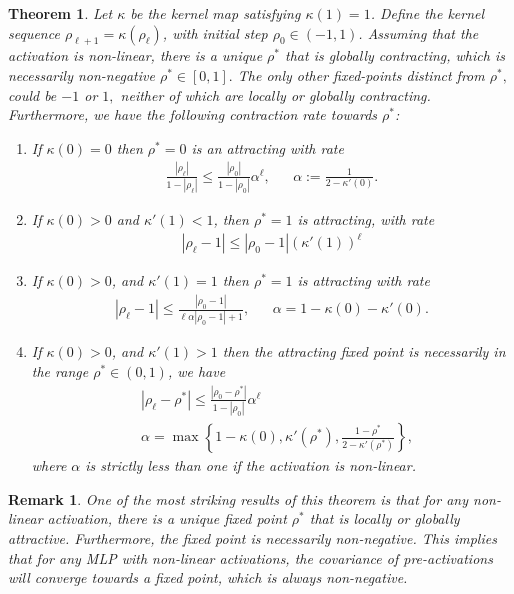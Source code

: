 \documentclass[twoside]{article}
\newtheorem{theorem}{Theorem}
\newtheorem{remark}{Remark}
\theoremstyle{definition}
\begin{document}
\begin{theorem}
Let $\kappa$ be the kernel map satisfying $\kappa(1)=1$. Define the kernel sequence $\rho_{\ell+1}=\kappa(\rho_\ell)$, with initial step $\rho_0 \in (-1,1)$. Assuming that the activation is non-linear, there is a unique $\rho^*$ that is globally contracting, which is necessarily non-negative $\rho^*\in[0,1].$ The only other fixed-points distinct from $\rho^*,$ could be $-1$ or $1,$ neither of which are locally or globally contracting. Furthermore, we have the following contraction rate towards $\rho^*$:
\begin{enumerate}
    \item If $\kappa(0)=0$ then $\rho^*=0$ is an attracting with rate 
    \begin{align*}
    \frac{|\rho_\ell|}{1-|\rho_\ell|} \le \frac{|\rho_0|}{1-|\rho_0|} \alpha^\ell, && \alpha:=\frac{1}{2-\kappa'(0)}.
    \end{align*}
    \item If $\kappa(0)>0$ and $\kappa'(1)<1$, then $\rho^*=1$ is attracting, with rate 
    \begin{align*}
    |\rho_\ell-1| \le |\rho_0-1| (\kappa'(1))^\ell
    \end{align*}
    \item If $\kappa(0) > 0$, and $\kappa'(1)=1$ then  $\rho^*=1$ is attracting with rate 
    \begin{align*}
    |\rho_\ell-1| \le \frac{|\rho_0-1|}{\ell\alpha|\rho_0-1|+1}, && \alpha = 1-\kappa(0)-\kappa'(0).
    \end{align*}
    \item If $\kappa(0) > 0$, and $\kappa'(1)>1$ then the attracting fixed point is necessarily in the range $\rho^*\in(0,1)$, we have  
    \begin{align*}
    &|\rho_\ell-\rho^*| \le \frac{|\rho_0-\rho^*|}{1-|\rho_0|}\alpha^\ell \\ &\alpha = \max\left\{1-\kappa(0),\kappa'(\rho^*),\frac{1-\rho^*}{2-\kappa'(\rho^*)}\right\},
    \end{align*}
    where $\alpha$ is strictly less than one if the activation is non-linear.
\end{enumerate}
\end{theorem}

\begin{remark}
One of the most striking results of this theorem is that for any non-linear activation, there is a unique fixed point $\rho^*$ that is locally or globally attractive. Furthermore, the fixed point is necessarily non-negative. This implies that for any MLP with non-linear activations, the covariance of pre-activations will converge towards a fixed point, which is always non-negative. 
\end{remark}
\end{document}
